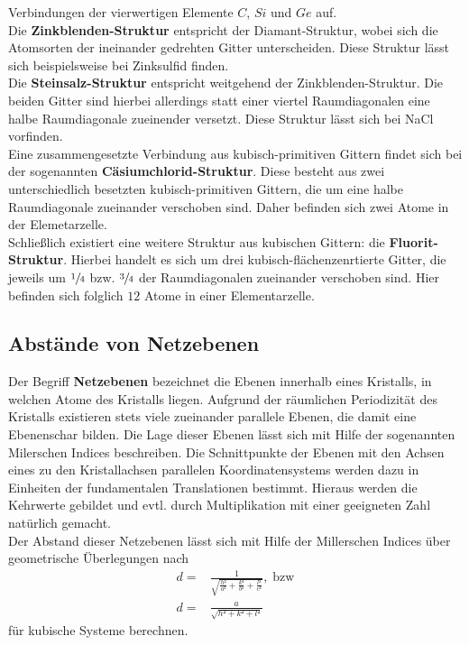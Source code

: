 Verbindungen der vierwertigen Elemente $C$, $Si$ und $Ge$ auf.\\
Die \textbf{Zinkblenden-Struktur} entspricht der Diamant-Struktur, wobei sich die Atomsorten der ineinander gedrehten
Gitter unterscheiden. Diese Struktur lässt sich beispielsweise bei Zinksulfid finden. \\
Die \textbf{Steinsalz-Struktur} entspricht weitgehend der Zinkblenden-Struktur. Die beiden Gitter sind hierbei allerdings
statt einer viertel Raumdiagonalen eine halbe Raumdiagonale zueinender versetzt. Diese Struktur lässt sich bei NaCl
vorfinden.\\
Eine zusammengesetzte Verbindung aus kubisch-primitiven Gittern findet sich bei der sogenannten \textbf{Cäsiumchlorid-Struktur}.
Diese besteht aus zwei unterschiedlich besetzten kubisch-primitiven Gittern, die um eine halbe Raumdiagonale zueinander verschoben
sind. Daher befinden sich zwei Atome in der Elemetarzelle. \\
Schließlich existiert eine weitere Struktur aus kubischen Gittern: die \textbf{Fluorit-Struktur}. Hierbei handelt es sich um drei
kubisch-flächenzenrtierte Gitter, die jeweils um $\sfrac{1}{4}$ bzw. $\sfrac{3}{4}$ der Raumdiagonalen zueinander verschoben sind.
Hier befinden sich folglich $12$ Atome in einer Elementarzelle.
%
\subsection{Abstände von Netzebenen}
%
Der Begriff \textbf{Netzebenen} bezeichnet die Ebenen innerhalb eines Kristalls, in welchen Atome des Kristalls liegen. Aufgrund
der räumlichen Periodizität des Kristalls existieren stets viele zueinander parallele Ebenen, die damit eine Ebenenschar bilden.
Die Lage dieser Ebenen lässt sich mit Hilfe der sogenannten Milerschen Indices beschreiben. Die Schnittpunkte der Ebenen mit den
Achsen eines zu den Kristallachsen parallelen Koordinatensystems werden dazu in Einheiten der fundamentalen Translationen bestimmt.
Hieraus werden die Kehrwerte gebildet und evtl. durch Multiplikation mit einer geeigneten Zahl natürlich gemacht.\\
Der Abstand dieser Netzebenen lässt sich mit Hilfe der Millerschen Indices über geometrische Überlegungen nach
%
\begin{align}
  d=&\frac{1}{\sqrt{\frac{h²}{a²}+\frac{k²}{b²}+\frac{l²}{c²}}}, \; \text{bzw} \\
  d=&\frac{a}{\sqrt{h²+k²+l²}}
\end{align}
%
für kubische Systeme berechnen.
%
